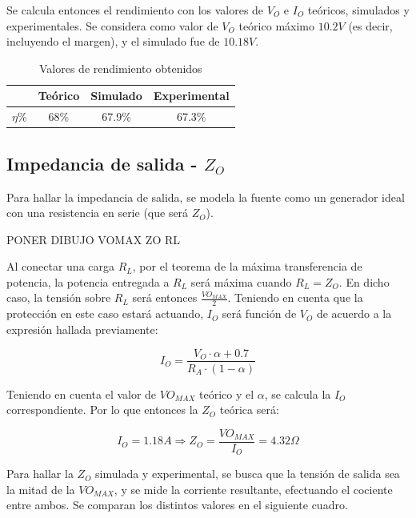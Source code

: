 Se calcula entonces el rendimiento con los valores de $V_O$ e $I_O$ te\'oricos, simulados y experimentales. Se considera como valor de $V_O$ te\'orico m\'aximo $10.2V$ (es decir, incluyendo el margen), y el simulado fue de $10.18V$.

\begin{table}[!h]
\begin{center}
\begin{tabular}{|c||c|c|c|}
\hline
& Te\'orico & Simulado & Experimental\\
\hline 
$\eta \%$ & 68\% & 67.9\% & 67.3\%\\
\hline 
\end{tabular}
\end{center}

\caption{Valores de rendimiento obtenidos}
\end{table}

\subsection{Impedancia de salida - $Z_O$}

Para hallar la impedancia de salida, se modela la fuente como un generador ideal con una resistencia en serie (que ser\'a $Z_O$).

PONER DIBUJO VOMAX ZO RL
 
Al conectar una carga $R_L$, por el teorema de la m\'axima transferencia de potencia, la potencia entregada a $R_L$ ser\'a m\'axima cuando $R_L = Z_O$. En dicho caso, la tensi\'on sobre $R_L$ ser\'a entonces $\frac{VO_{MAX}}{2}$. Teniendo en cuenta que la protecci\'on en este caso estar\'a actuando, $I_O$ ser\'a funci\'on de $V_O$ de acuerdo a la expresi\'on hallada previamente:

$$I_O = \frac{V_O \cdot \alpha + 0.7}{R_A \cdot (1-\alpha)}$$

Teniendo en cuenta el valor de $VO_{MAX}$ te\'orico y el $\alpha$, se calcula la $I_O$ correspondiente. Por lo que entonces la $Z_O$ te\'orica ser\'a:

$$I_O = 1.18A \Longrightarrow Z_O = \frac{VO_{MAX}}{I_O} = 4.32\Omega$$

Para hallar la $Z_O$ simulada y experimental, se busca que la tensi\'on de salida sea la mitad de la $VO_{MAX}$, y se mide la corriente resultante, efectuando el cociente entre ambos. Se comparan los distintos valores en el siguiente cuadro.

